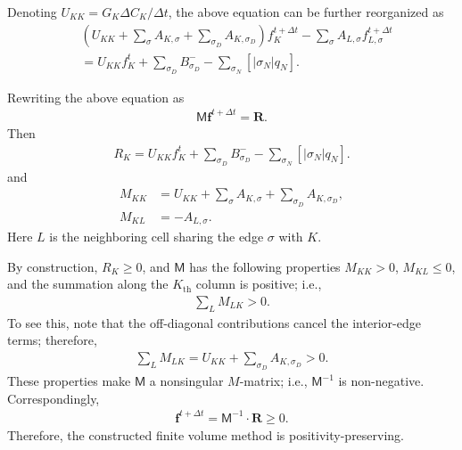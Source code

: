 \documentclass[11pt]{article}
\begin{document}
Denoting $U_{KK} = G_{K} \Delta C_{K} / \Delta t$, the above equation can be further reorganized as 
\begin{align}
   &\left(U_{KK} + \sum_{\sigma} A_{K,\sigma} + \sum_{\sigma_{D}} A_{K,\sigma_{D}} \right) f_{K}^{t+\Delta t} - \sum_{\sigma} A_{L,\sigma} f_{L,\sigma}^{t+\Delta t} \\
   & = U_{KK} f_{K}^{t} + \sum_{\sigma_{D}} B_{\sigma_{D}}^{-} - \sum_{\sigma_{N}} \left[|\sigma_{N}| q_{N}\right].
   \label{eq:fvm}
\end{align}

Rewriting the above equation as
  \begin{align}
    \mathsf{M} \boldsymbol{f}^{t+\Delta t} = \boldsymbol{R}. 
  \end{align}
Then
\begin{align}
    R_{K} = U_{KK} f_{K}^{t} + \sum_{\sigma_{D}} B_{\sigma_{D}}^{-} - \sum_{\sigma_{N}} \left[|\sigma_{N}| q_{N}\right].
\end{align}
and
\begin{align}
  M_{KK} &= U_{KK} + \sum_{\sigma} A_{K,\sigma} + \sum_{\sigma_{D}} A_{K,\sigma_{D}}, \\
  M_{KL} &= -A_{L,\sigma}.
\end{align}
Here $L$ is the neighboring cell sharing the edge $\sigma$ with $K$.

By construction, $R_{K} \geq 0$, and $\mathsf{M}$ has the following properties
$M_{KK} > 0$, $M_{KL} \le 0$, and the summation along the $K_{\text{th}}$ column
is positive; i.e., 
  \begin{align}
    \sum_{L} M_{LK} > 0.
  \end{align}
To see this, note that the off-diagonal contributions cancel the interior-edge terms; therefore, 
  \begin{align}
    \sum_{L} M_{LK} = U_{KK} + \sum_{\sigma_{D}} A_{K,\sigma_{D}} > 0.
  \end{align}
These properties make $\mathsf{M}$ a nonsingular $M$-matrix; i.e.,
$\mathsf{M}^{-1}$ is non-negative. Correspondingly, 
  \begin{align}
      \boldsymbol{f}^{t+\Delta t} = \mathsf{M}^{-1} \cdot \boldsymbol{R}  \geq 0.
  \end{align}
Therefore, the constructed finite volume method is positivity-preserving.
\end{document}
